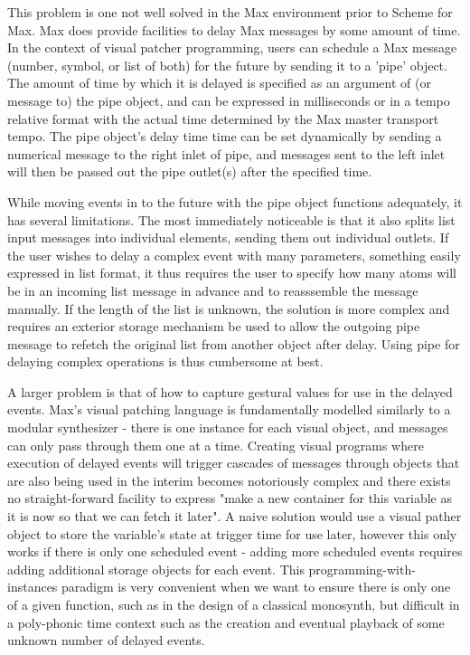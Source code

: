\documentclass[acmsmall]{acmart}
\begin{document}
This problem is one not well solved in the Max environment prior 
to Scheme for Max. Max does provide facilities to delay Max messages by some
amount of time. In the context of visual patcher programming, users can schedule 
a Max message (number, symbol, or list of both) for the future by sending it to a 
'pipe' object. The amount of time by which it is delayed is specified as an argument of
(or message to) the pipe object, and can be expressed in milliseconds or in a tempo 
relative format with the actual time determined by the Max master transport tempo. 
The pipe object’s delay time time can be set dynamically by sending a numerical message
to the right inlet of pipe, and messages sent to the left inlet will then be passed out
the pipe outlet(s) after the specified time. 

While moving events in to the future with the pipe object functions adequately, 
it has several limitations. The most immediately noticeable is that it also splits 
list input messages into individual elements, sending them out individual outlets. 
If the user wishes to delay a complex event with many parameters, something easily 
expressed in list format, it thus requires the user to specify how many atoms will 
be in an incoming list message in advance and to reasssemble the message manually.
If the length of the list is unknown, the solution is more complex and requires 
an exterior storage mechanism be used to allow the outgoing 
pipe message to refetch the original list from another object after delay. Using
pipe for delaying complex operations is thus cumbersome at best. 

A larger problem is that of how to capture gestural values for use in the delayed
events. Max's visual patching language is fundamentally modelled similarly to a modular
synthesizer - there is one instance for each visual object, and messages can only
pass through them one at a time. Creating visual programs where execution of 
delayed events will trigger cascades of messages through objects that are also 
being used in the interim becomes notoriously complex and there exists no straight-forward
facility to express "make a new container for this variable as it is now so that
we can fetch it later". A naive solution would use a visual pather object to store 
the variable's state at trigger time for use later, however this only works
if there is only one scheduled event - adding more scheduled events requires adding
additional storage objects for each event. This programming-with-instances paradigm
is very convenient when we want to ensure there is only one of a given function, such
as in the design of a classical monosynth, but difficult in a poly-phonic time context
such as the creation and eventual playback of some unknown number of delayed events.
\end{document}
